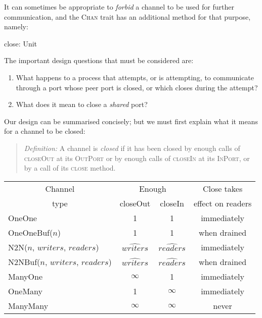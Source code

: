 \documentclass[12pt]{IOS-Book-Article-CPA-2017}
\begin{document}
It can sometimes be appropriate to \textit{forbid} a channel
to be used for further communication, and the \textsc{Chan} trait 
has an additional method for that purpose, namely:
\begin{code}[]
        close: Unit
\end{code}
The important design questions that must be considered are: 
\begin{enumerate}
\item   What happens to a process that attempts, or is 
        attempting, to communicate through a port whose peer
        port is closed, or which closes during the attempt?

\item   What does it mean to close a \textit{shared} port?
\end{enumerate}
Our design can be summarised concisely; but we must first
explain what it means for a {channel} to be closed:

\begin{quote}
        \textit{Definition: }A channel is \textit{closed} if it has
        been closed by enough calls of \textsc{closeOut} at its \textsc{OutPort} 
        or by enough calls of \textsc{closeIn} at its \textsc{InPort}, or by
        a call of its \textsc{close} method.
\end{quote}
\begin{center}
\begin{tabular}{|l|c|c|c|}\hline
\multicolumn{1}{|c|}{Channel}& \multicolumn{2}{c|}{Enough} &\multicolumn{1}{c|}{Close takes}\\
\multicolumn{1}{|c|}{type}& closeOut & closeIn & \multicolumn{1}{c|}{effect on readers}\\\hline
OneOne          & 1              & 1             & immediately\\
OneOneBuf($n$)       & 1              & 1             & when drained\\
N2N($n$, $writers$, $readers$) & $\widehat{writers}$ & $\widehat{readers}$  & immediately\\
N2NBuf($n$, $writers$, $readers$) & $\widehat{writers}$ & $\widehat{readers}$  & when drained\\\hline
ManyOne & $\infty$ & 1 & immediately\\
OneMany & 1 & $\infty$ & immediately\\
ManyMany & $\infty$ & $\infty$ & never\\\hline
\end{tabular}
\end{center}
\end{document}
